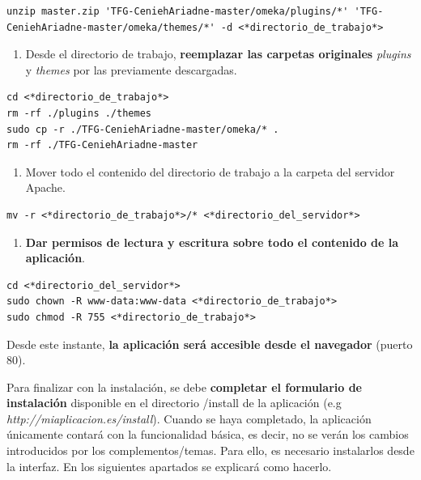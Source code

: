 \documentclass[
]{article}
\providecommand{\tightlist}{%
  \setlength{\itemsep}{0pt}\setlength{\parskip}{0pt}}
\begin{document}
\begin{verbatim}
unzip master.zip 'TFG-CeniehAriadne-master/omeka/plugins/*' 'TFG-CeniehAriadne-master/omeka/themes/*' -d <*directorio_de_trabajo*>
\end{verbatim}

\begin{enumerate}
\def\labelenumi{\arabic{enumi}.}
\setcounter{enumi}{6}
\tightlist
\item
  Desde el directorio de trabajo, \textbf{reemplazar las carpetas
  originales} \emph{plugins} y \emph{themes} por las previamente
  descargadas.
\end{enumerate}

\begin{verbatim}
cd <*directorio_de_trabajo*>
rm -rf ./plugins ./themes
sudo cp -r ./TFG-CeniehAriadne-master/omeka/* .
rm -rf ./TFG-CeniehAriadne-master
\end{verbatim}

\begin{enumerate}
\def\labelenumi{\arabic{enumi}.}
\setcounter{enumi}{7}
\tightlist
\item
  Mover todo el contenido del directorio de trabajo a la carpeta del
  servidor Apache.
\end{enumerate}

\begin{verbatim}
mv -r <*directorio_de_trabajo*>/* <*directorio_del_servidor*>
\end{verbatim}

\begin{enumerate}
\def\labelenumi{\arabic{enumi}.}
\setcounter{enumi}{8}
\tightlist
\item
  \textbf{Dar permisos de lectura y escritura sobre todo el contenido de
  la aplicación}.
\end{enumerate}

\begin{verbatim}
cd <*directorio_del_servidor*>
sudo chown -R www-data:www-data <*directorio_de_trabajo*>
sudo chmod -R 755 <*directorio_de_trabajo*>
\end{verbatim}

Desde este instante, \textbf{la aplicación será accesible desde el
navegador} (puerto 80).

Para finalizar con la instalación, se debe \textbf{completar el
formulario de instalación} disponible en el directorio {/install} de la
aplicación (e.g \emph{http://miaplicacion.es/install}). Cuando se haya
completado, la aplicación únicamente contará con la funcionalidad
básica, es decir, no se verán los cambios introducidos por los
complementos/temas. Para ello, es necesario instalarlos desde la
interfaz. En los siguientes apartados se explicará como hacerlo.
\end{document}
